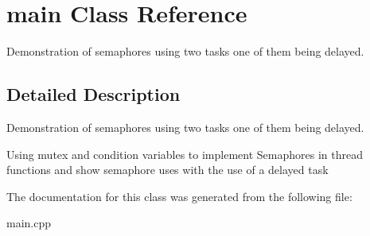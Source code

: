 \hypertarget{classmain}{}\section{main Class Reference}
\label{classmain}


Demonstration of semaphores using two tasks one of them being delayed.  




\subsection{Detailed Description}
Demonstration of semaphores using two tasks one of them being delayed. 

Using mutex and condition variables to implement Semaphores in thread functions and show semaphore uses with the use of a delayed task 

The documentation for this class was generated from the following file\+:\begin{DoxyCompactItemize}
\item 
main.\+cpp\end{DoxyCompactItemize}

